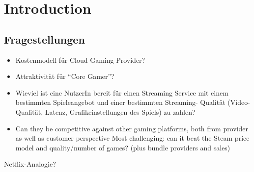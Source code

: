

\section{Introduction}

\subsection{Fragestellungen}

\begin{itemize}
	\item Kostenmodell für Cloud Gaming Provider?
	\item Attraktivität für “Core Gamer”?
	\item Wieviel ist eine NutzerIn bereit für einen Streaming Service mit einem bestimmten Spieleangebot und einer bestimmten Streaming- Qualität (Video-Qualität, Latenz, Grafikeinstellungen des Spiels) zu zahlen?
	\item Can they be competitive against other gaming platforms, both from provider as well as customer perspective
			Most challenging: can it beat the Steam price model and quality/number of games? (plus bundle providers and sales)
\end{itemize}

Netflix-Analogie? 